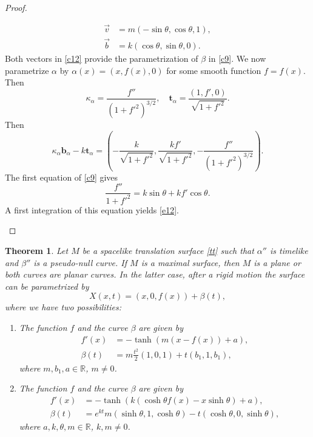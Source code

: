 \documentclass[a4paper,12pt]{amsart}
\numberwithin{equation}{section}
\newtheorem{theorem}{Theorem}[section]
\theoremstyle{definition}
\def\r{\mathbb R}
\def\r{\mathbb R}
\def\t{\mathbf t}
\def\b{\mathbf b}
\begin{document}
\begin{proof}
\begin{enumerate}
\begin{enumerate}
\begin{equation*}
\begin{split}
\vec{v}&=m(-\sin\theta,\cos\theta,1),\\
 \vec{b}&=k(\cos\theta,\sin\theta,0).
 \end{split}
 \end{equation*}
Both vectors in \eqref{c12} provide the parametrization of $\beta$  in \eqref{c9}. We now parametrize $\alpha$ by $\alpha(x)=(x,f(x),0)$ for some smooth function $f=f(x)$. Then 
$$\kappa_\alpha=\frac{f''}{(1+f'^2)^{3/2}},\quad \t_\alpha=\frac{(1,f',0)}{\sqrt{1+f'^2}}.$$ 
Then
$$\kappa_\alpha\b_\alpha-k\t_\alpha=\left(-\frac{k}{\sqrt{1+f'^2}},\frac{kf'}{\sqrt{1+f'^2}},-\frac{f''}{(1+f'^2)^{3/2}}\right).$$
The first equation of \eqref{c9} gives 
$$\frac{f''}{1+f'^2}=k\sin\theta+kf'\cos\theta.$$
A first integration of this equation yields \eqref{e12}.   


 
\end{enumerate}


\end{enumerate}
\end{proof}

 


\begin{theorem}  \label{t32}
Let $M$ be a spacelike  translation surface \eqref{tt} such that  $\alpha''$  is timelike and $\beta''$ is a pseudo-null curve. If $M$ is a maximal surface, then $M$ is a plane or both curves are planar curves. In the latter case,   after a rigid motion the surface can be parametrized by
$$X(x,t)=(x,0,f(x))+\beta(t),$$
where we have two possibilities:
\begin{enumerate}
\item The function $f$ and the curve $\beta$ are given by  
\begin{equation}\label{e10}
\begin{split}
f'(x)&=-\tanh\left(m(x-f(x))+a\right),\\
\beta(t)&=m\frac{t^2}{2}(1,0,1)+t(b_1,1,b_1),
\end{split}
\end{equation}
where  $m,b_1,a\in\r$, $m\not=0$.  
\item The function $f$ and the curve $\beta$ are given by  
\begin{equation}\label{e13}
\begin{split}
f'(x)&=-\tanh\left(k(\cosh\theta f(x)-x\sinh\theta)+a\right), \\
\beta(t)&=e^{kt}m(\sinh\theta,1,\cosh\theta)-t(\cosh\theta,0,\sinh\theta),
\end{split}
\end{equation}
where  $a,k,\theta,m\in\r$, $k,m\not=0$.
\end{enumerate}
\end{theorem}
\end{document}
